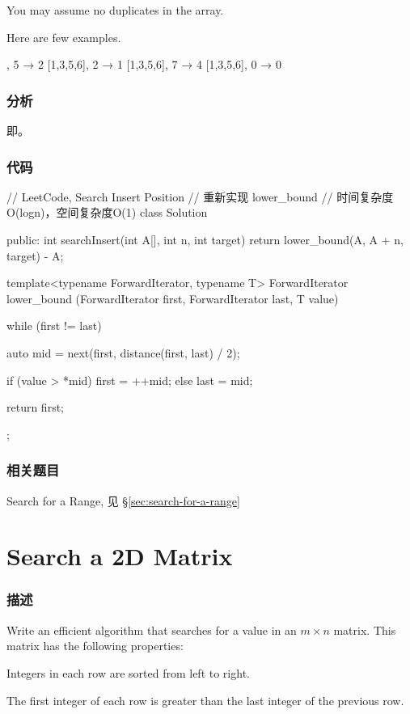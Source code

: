 You may assume no duplicates in the array.

Here are few examples.
\begin{Code}
	[1,3,5,6], 5 → 2
	[1,3,5,6], 2 → 1
	[1,3,5,6], 7 → 4
	[1,3,5,6], 0 → 0
\end{Code}


\subsubsection{分析}
即。


\subsubsection{代码}
\begin{Code}
	// LeetCode, Search Insert Position
	// 重新实现 lower_bound
	// 时间复杂度O(logn)，空间复杂度O(1)
	class Solution {
		public:
		int searchInsert(int A[], int n, int target) {
			return lower_bound(A, A + n, target) - A;
		}
		
		template<typename ForwardIterator, typename T>
		ForwardIterator lower_bound (ForwardIterator first,
		ForwardIterator last, T value) {
			while (first != last) {
				auto mid = next(first, distance(first, last) / 2);
				
				if (value > *mid)   first = ++mid;
				else                last = mid;
			}
			
			return first;
		}
	};
\end{Code}


\subsubsection{相关题目}
\begindot
\item Search for a Range, 见 \S \ref{sec:search-for-a-range}
\myenddot


\section{Search a 2D Matrix} %
\label{sec:search-a-2d-matrix}


\subsubsection{描述}
Write an efficient algorithm that searches for a value in an $m \times n$ matrix. This matrix has the following properties:
\begindot
\item Integers in each row are sorted from left to right.
\item The first integer of each row is greater than the last integer of the previous row.
\myenddot

